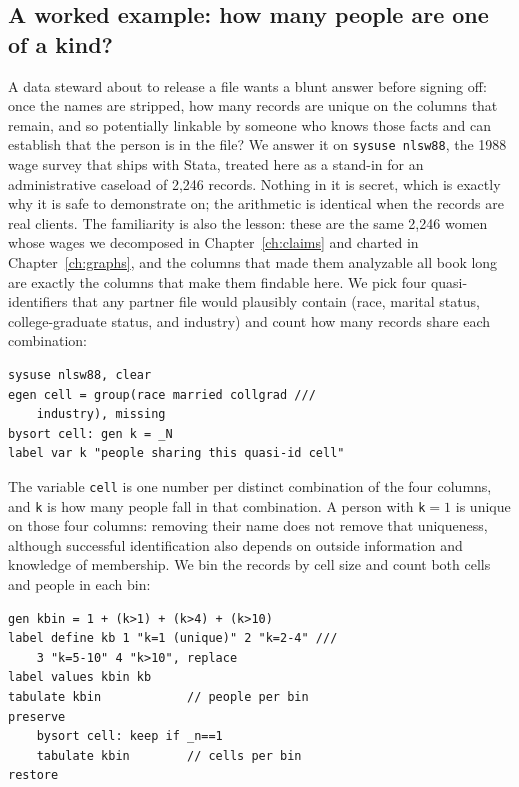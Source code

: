 \documentclass[
    a4paper,
    fontsize=10pt,
    twoside=true,
    numbers=noenddot,
]{kaobook}
\begin{document}
\subsection{A worked example: how many people are one of a kind?}\label{sec:kanon}
A data steward about to release a file wants a blunt answer before signing off: once the names are stripped, how many records are unique on the columns that remain, and so potentially linkable by someone who knows those facts and can establish that the person is in the file? We answer it on \texttt{sysuse nlsw88}, the 1988 wage survey that ships with Stata, treated here as a stand-in for an administrative caseload of 2{,}246 records. Nothing in it is secret, which is exactly why it is safe to demonstrate on; the arithmetic is identical when the records are real clients. The familiarity is also the lesson: these are the same 2{,}246 women whose wages we decomposed in Chapter~\ref{ch:claims} and charted in Chapter~\ref{ch:graphs}, and the columns that made them analyzable all book long are exactly the columns that make them findable here. We pick four quasi-identifiers that any partner file would plausibly contain (race, marital status, college-graduate status, and industry) and count how many records share each combination:
\par
{\footnotesize
\begin{verbatim}
sysuse nlsw88, clear
egen cell = group(race married collgrad ///
    industry), missing
bysort cell: gen k = _N
label var k "people sharing this quasi-id cell"
\end{verbatim}
}
The variable \texttt{cell} is one number per distinct combination of the four columns, and \texttt{k} is how many people fall in that combination. A person with \texttt{k}${}=1$ is unique on those four columns: removing their name does not remove that uniqueness, although successful identification also depends on outside information and knowledge of membership. We bin the records by cell size and count both cells and people in each bin:
\par
{\footnotesize
\begin{verbatim}
gen kbin = 1 + (k>1) + (k>4) + (k>10)
label define kb 1 "k=1 (unique)" 2 "k=2-4" ///
    3 "k=5-10" 4 "k>10", replace
label values kbin kb
tabulate kbin            // people per bin
preserve
    bysort cell: keep if _n==1
    tabulate kbin        // cells per bin
restore
\end{verbatim}
}
\end{document}
